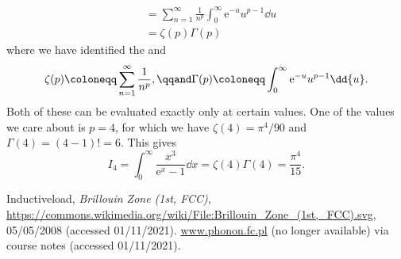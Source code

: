 \documentclass[fleqn]{NotesClass}
\newcommand*{\e}{\mathrm{e}}
\begin{document}
\begin{appendices}
\begin{align}
            &= \sum_{n=1}^{\infty} \frac{1}{n^p} \int_{0}^{\infty} \e^{-u}u^{p - 1} \dd{u}\\
            &= \zeta(p) \Gamma(p)
        \end{align}
        where we have identified the  and 
        \begin{equation}
            \zeta(p) \coloneqq \sum_{n=1}^{\infty} \frac{1}{n^p}, \qqand \Gamma(p) \coloneqq \int_{0}^{\infty} \e^{-u}u^{p - 1} \dd{u}.
        \end{equation}
        Both of these can be evaluated exactly only at certain values.
        One of the values we care about is \(p = 4\), for which we have \(\zeta(4) = \pi^4/90\) and \(\Gamma(4) = (4 - 1)! = 6\).
        This gives
        \begin{equation}
            I_4 = \int_{0}^{\infty} \frac{x^3}{\e^x - 1} \dd{x} = \zeta(4)\Gamma(4) = \frac{\pi^4}{15}.
        \end{equation}
    \end{appendices}

    \backmatter
    \begin{thebibliography}{9}
         Inductiveload, \textit{Brillouin Zone (1st, FCC)}, \url{https://commons.wikimedia.org/wiki/File:Brillouin_Zone_(1st,_FCC).svg}, 05/05/2008 (accessed 01/11/2021).
         \url{www.phonon.fc.pl} (no longer available) via course notes (accessed 01/11/2021).
    \end{thebibliography}
    \renewcommand{\glossaryname}{Acronyms}
    \printglossary[acronym]
    \printindex
\end{document}
